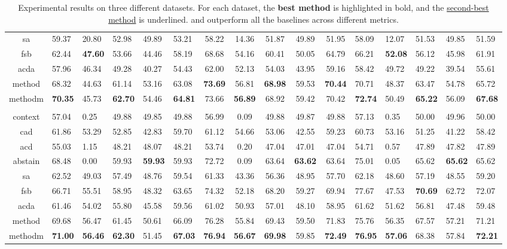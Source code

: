 \begin{table}[t!]
{\begin{tabular}{cgggggcccccggggg}
sa & 59.37 & 20.80 & 52.98 & 49.89 & 53.21 & 58.22 & 14.36 & 51.87 & 49.89 & 51.95 & 58.09 & 12.07 & 51.53 & 49.85 & 51.59 \\
fsb & 62.44 & \textbf{47.60} & 53.66 & 44.46 & 58.19 & 68.68 & 54.16 & 60.41 & 50.05 & 64.79 & 66.21 & \textbf{52.08} & 56.12 & 45.98 & 61.91 \\
acda & 57.96 & 46.34 & 49.28 & 40.27 & 54.43 & 62.00 & 52.13 & 54.03 & 43.95 & 59.16 & 58.42 & 49.72 & 49.22 & 39.54 & 55.61 \\
method & 68.32 & 44.63 & 61.14 & 53.16 & 63.08 & \textbf{73.69} & 56.81 & \textbf{68.98} & 59.53 & \textbf{70.44} & 70.71 & 48.37 & 63.47 & 54.78 & 65.72 \\
methodm & \textbf{70.35} & 45.73 & \textbf{62.70} & 54.46 & \textbf{64.81} & 73.66 & \textbf{56.89} & 68.92 & 59.42 & 70.42 & \textbf{72.74} & 50.49 & \textbf{65.22} & 56.09 & \textbf{67.68} \\
\midrule
 \\
\midrule
context & 57.04 & 0.25 & 49.88 & 49.85 & 49.88 & 56.99 & 0.09 & 49.88 & 49.87 & 49.88 & 57.13 & 0.35 & 50.00 & 49.96 & 50.00 \\
cad & 61.86 & 53.29 & 52.85 & 42.83 & 59.70 & 61.12 & 54.66 & 53.06 & 42.55 & 59.23 & 60.73 & 53.16 & 51.25 & 41.22 & 58.42 \\
acd & 55.03 & 1.15 & 48.21 & 48.07 & 48.21 & 53.74 & 0.20 & 47.04 & 47.01 & 47.04 & 54.71 & 0.57 & 47.89 & 47.82 & 47.89 \\
abstain & 68.48 & 0.00 & 59.93 & \textbf{59.93} & 59.93 & 72.72 & 0.09 & 63.64 & \textbf{63.62} & 63.64 & 75.01 & 0.05 & 65.62 & \textbf{65.62} & 65.62 \\
sa & 62.52 & 49.03 & 57.49 & 48.76 & 59.54 & 61.33 & 43.36 & 56.36 & 48.95 & 57.70 & 62.18 & 48.60 & 57.19 & 48.55 & 59.20 \\
fsb & 66.71 & 55.51 & 58.95 & 48.32 & 63.65 & 74.32 & 52.18 & 68.20 & 59.27 & 69.94 & 77.67 & 47.53 & \textbf{70.69} & 62.72 & 72.07 \\
acda & 61.46 & 54.02 & 55.80 & 45.58 & 59.56 & 61.02 & 50.93 & 57.01 & 48.10 & 58.95 & 61.62 & 51.62 & 56.81 & 47.48 & 59.48 \\
method & 69.68 & 56.47 & 61.45 & 50.61 & 66.09 & 76.28 & 55.84 & 69.43 & 59.50 & 71.83 & 75.76 & 56.35 & 67.57 & 57.21 & 71.21 \\
methodm & \textbf{71.00} & \textbf{56.46} & \textbf{62.30} & 51.45 & \textbf{67.03} & \textbf{76.94} & \textbf{56.67} & \textbf{69.98} & 59.85 & \textbf{72.49} & \textbf{76.95} & \textbf{57.06} & 68.38 & 57.84 & \textbf{72.21} \\
\bottomrule
\end{tabular}
    }
    \caption{
        Experimental results on three different datasets.
        For each dataset, the \textbf{best method} is highlighted in bold, and the \underline{second-best method} is underlined.
        \method{} and \methodm{} outperform all the baselines across different metrics.
    }
    \label{table:main_results_v2}
\end{table}

